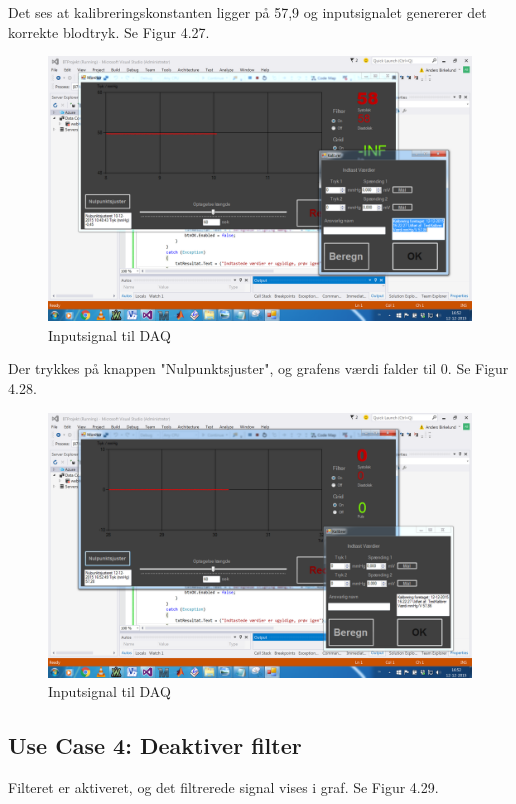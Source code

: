 Det ses at kalibreringskonstanten ligger på 57,9 og inputsignalet genererer det korrekte blodtryk. Se Figur 4.27.
\begin{figure}[H]
	\centering
	\includegraphics[width=1\textwidth]{Figurer/Test_Nul_2}
	\caption{Inputsignal til DAQ}
\end{figure}

Der trykkes på knappen "Nulpunktsjuster", og grafens værdi falder til 0. Se Figur 4.28.

\begin{figure}[H]
	\centering
	\includegraphics[width=1\textwidth]{Figurer/Test_Nul_3}
	\caption{Inputsignal til DAQ}
\end{figure}


\subsection{Use Case 4: Deaktiver filter}

Filteret er aktiveret, og det filtrerede signal vises i graf. Se Figur 4.29.

